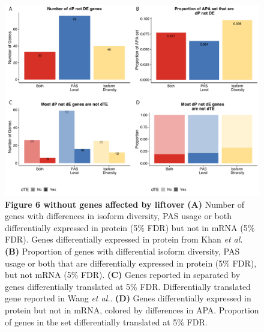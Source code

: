 \begin{figure}[!htb]
\centering
\includegraphics[width=5in]{img/ch03/Fig6-figSup2.pdf}
\caption[Figure 6 without genes affected by liftover]{\textbf{Figure 6 without genes affected by liftover} {\bf (A)} Number of genes with differences in isoform diversity, PAS usage or both differentially expressed in protein (5\% FDR) but not in mRNA (5\% FDR). Genes differentially expressed in protein from Khan \emph{et al.}\citep{khan_primate_2013} {\bf (B)} Proportion of genes with differential isoform diversity, PAS usage or both that are differentially expressed in protein (5\% FDR), but not mRNA (5\% FDR). {\bf (C)} Genes reported in separated by genes differentially translated at 5\% FDR. Differentially translated gene reported in Wang \emph{et al.}\citep{wang_post-translational_2018}. {\bf (D)} Genes differentially expressed in protein but not in mRNA, colored by differences in APA. Proportion of genes in the set differentially translated at 5\% FDR.}
\label{fig:ch03-unliftfig6}
\end{figure}
\clearpage


